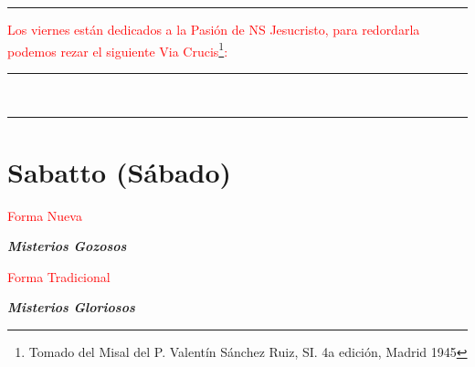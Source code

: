 \documentclass[10pt,twoside]{book}
\begin{document}




\vspace{0.75em}



{}

\iralfinal

\begin{center}
      {\rule{10em}{0.4pt}}

      \vspace{0.75em}

      \textcolor{red}{Los viernes están dedicados a la Pasión de NS Jesucristo, para redordarla podemos rezar el siguiente Via Crucis\footnote{Tomado del Misal del P. Valentín Sánchez Ruiz, SI. 4a edición, Madrid 1945}:}
\end{center}

\begin{multicols}{2}

      

\end{multicols}

\begin{center}
      \begin{spacing}{0.25}
            {\rule{20em}{0.4pt}}\\
            {\rule{20em}{0.4pt}}
      \end{spacing}
\end{center}



\section*{\centering Sabatto (Sábado)}

\begin{paracol}{2}
      \begin{leftcolumn}
            \begin{center}
                  \textcolor{red}{Forma Nueva}

                  \textbf{\textsl{Misterios Gozosos}}
            \end{center}
             
            
      \end{leftcolumn}
      \begin{rightcolumn}
            \begin{center}
                  \textcolor{red}{Forma Tradicional}

                  \textbf{\textsl{Misterios Gloriosos}}
            \end{center}                  
                  
            
      \end{rightcolumn}
\end{paracol}
\end{document}
